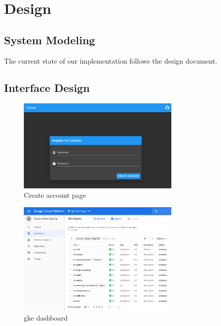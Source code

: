 
\section{Design}\label{sec:design}
    \subsection{System Modeling}
        The current state of our implementation follows the design document.

    \subsection{Interface Design}
        \begin{figure}[h!]
            \centering
            \caption{Create account page}
            \includegraphics[width=0.7\textwidth]{images/register.png}
        \end{figure}

        \begin{figure}[h!]
            \centering
            \caption{\gls{gke} dashboard}
            \includegraphics[width=0.7\textwidth]{images/gke.png}
        \end{figure}
